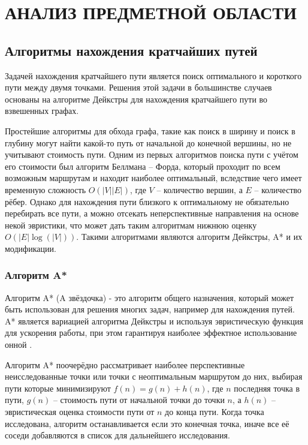 \section[Анализ предметной области]{\MakeTextUppercase{АНАЛИЗ ПРЕДМЕТНОЙ ОБЛАСТИ}}
\vspace{-1\baselineskip} 
\subsection{Алгоритмы нахождения кратчайших путей}

Задачей нахождения кратчайшего пути является поиск оптимального и короткого пути между двумя точками. Решения этой задачи в большинстве случаев основаны на алгоритме Дейкстры \cite{Dijkstra} для нахождения кратчайшего пути во взвешенных графах. 

Простейшие алгоритмы для обхода графа, такие как поиск в ширину и поиск в глубину могут найти какой-то путь от начальной до конечной вершины, но не учитывают стоимость пути. Одним из первых алгоритмов поиска пути с учётом его стоимости был алгоритм Беллмана -- Форда, который проходит по всем возможным маршрутам и находит наиболее оптимальный, вследствие чего имеет временную сложность $O(|V||E|)$, где $V$ -- количество вершин, а $E$ -- количество рёбер. Однако для нахождения пути близкого к оптимальному не обязательно перебирать все пути, а можно отсекать неперспективные направления на основе некой эвристики, что может дать таким алгоритмам нижнюю оценку $O(|E|\log(|V|))$. Такими алгоритмами являются алгоритм Дейкстры, A* и их модификации.

\subsubsection{Алгоритм A*}

Алгоритм A{*} (A звёздочка) - это алгоритм общего назначения, который может быть использован для решения многих задач, например для нахождения путей. A{*} является вариацией алгоритма Дейкстры и используя эвристическую функция для ускорения работы, при этом гарантируя наиболее эффектное использование онной \cite{A_STAR}. 

Алгоритм A{*} поочерёдно рассматривает наиболее перспективные неисследованные точки или точки с неоптимальным маршрутом до них, выбирая пути которые минимизируют $ f(n) = g(n) + h(n) $, где $n$ последняя точка в пути, $g(n)$ -- стоимость пути от начальной точки до точки $n$, а $h(n)$ -- эвристическая оценка стоимости пути от $n$ до конца пути. Когда точка исследована, алгоритм останавливается если это конечная точка, иначе все её соседи добавляются в список для дальнейшего исследования.

